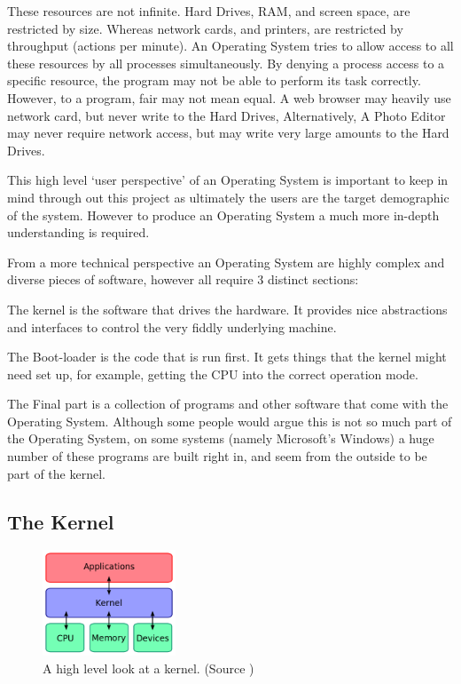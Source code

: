 \documentclass[a4paper]{report}
\begin{document}
These resources are not infinite. Hard Drives, RAM, and screen space, are restricted by size. Whereas network cards, and printers, are restricted by throughput (actions per minute). An Operating System tries to allow access to all these resources by all processes simultaneously. By denying a process access to a specific resource, the program may not be able to perform its task correctly. However, to a program, fair may not mean equal. A web browser may heavily use network card, but never write to the Hard Drives, Alternatively, A Photo Editor may never require network access, but may write very large amounts to the Hard Drives.



\vspace{1.5mm}
\noindent
This high level `user perspective' of an Operating System is important to keep in mind through out this project as ultimately the users are the target demographic of the system. However to produce an Operating System a much more in-depth understanding is required.




From a more technical perspective an Operating System are highly complex and diverse pieces of software, however all require 3 distinct sections:

The kernel is the software that drives the hardware. It provides nice abstractions and interfaces to control the very fiddly underlying machine.

The Boot-loader is the code that is run first. It gets things that the kernel might need set up, for example, getting the CPU into the correct operation mode.

The Final part is a collection of programs and other software that come with the Operating System. Although some people would argue this is not so much part of the Operating System, on some systems (namely Microsoft's Windows) a huge number of these programs are built right in, and seem from the outside to be part of the kernel.


\subsection{The Kernel}

\begin{figure}
\centering
\includegraphics[width=150px]{images/kernel}
\caption{A high level look at a kernel. (Source \cite{Kernel})}
\vspace{-10pt}
\label{fig:thekernel}
\end{figure}
\end{document}
